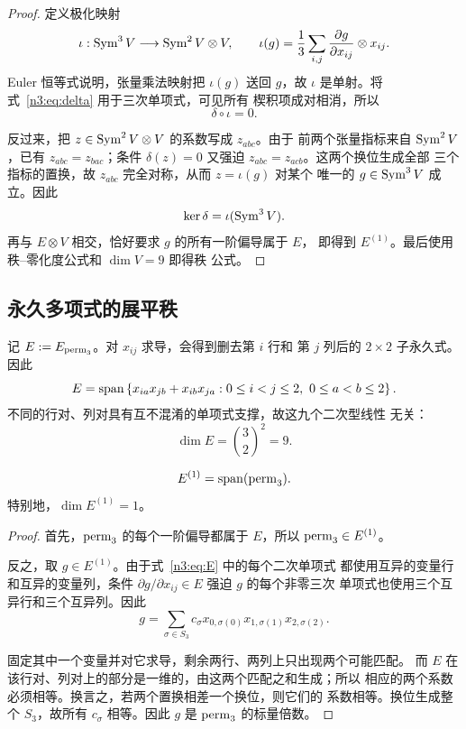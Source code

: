 \begin{proof}
定义极化映射
\[
  \iota:\operatorname{Sym}^3V\longrightarrow\operatorname{Sym}^2V\otimes V,
  \qquad
  \iota(g)=\frac13\sum_{i,j}
  \frac{\partial g}{\partial x_{ij}}\otimes x_{ij}.
\]
Euler 恒等式说明，张量乘法映射把 \(\iota(g)\) 送回 \(g\)，故
\(\iota\) 是单射。将式~\eqref{n3:eq:delta} 用于三次单项式，可见所有
楔积项成对相消，所以
\[
  \delta\circ\iota=0.
\]

反过来，把 \(z\in\operatorname{Sym}^2V\otimes V\) 的系数写成 \(z_{abc}\)。由于
前两个张量指标来自 \(\operatorname{Sym}^2V\)，已有 \(z_{abc}=z_{bac}\)；条件
\(\delta(z)=0\) 又强迫 \(z_{abc}=z_{acb}\)。这两个换位生成全部
三个指标的置换，故 \(z_{abc}\) 完全对称，从而 \(z=\iota(g)\) 对某个
唯一的 \(g\in\operatorname{Sym}^3V\) 成立。因此
\[
  \ker\delta=\iota(\operatorname{Sym}^3V).
\]
再与 \(E\otimes V\) 相交，恰好要求 \(g\) 的所有一阶偏导属于 \(E\)，
即得到 \(E^{(1)}\)。最后使用秩--零化度公式和 \(\dim V=9\) 即得秩
公式。
\end{proof}

\subsection{永久多项式的展平秩}

记 \(E:=E_{\operatorname{perm}_3}\)。对 \(x_{ij}\) 求导，会得到删去第 \(i\) 行和
第 \(j\) 列后的 \(2\times2\) 子永久式。因此
\begin{equation}\label{n3:eq:E}
  E=
  \operatorname{span}\left\{
  x_{ia}x_{jb}+x_{ib}x_{ja}:
  0\leq i<j\leq2,\ 0\leq a<b\leq2
  \right\}.
\end{equation}
不同的行对、列对具有互不混淆的单项式支撑，故这九个二次型线性
无关：
\begin{equation}\label{n3:eq:E-dim}
  \dim E=\binom32^2=9.
\end{equation}

\begin{proposition}\label{n3:prop:prolongation}
\[
  E^{(1)}=\operatorname{span}(\operatorname{perm}_3).
\]
特别地，\(\dim E^{(1)}=1\)。
\end{proposition}

\begin{proof}
首先，\(\operatorname{perm}_3\) 的每个一阶偏导都属于 \(E\)，所以
\(\operatorname{perm}_3\in E^{(1)}\)。

反之，取 \(g\in E^{(1)}\)。由于式~\eqref{n3:eq:E} 中的每个二次单项式
都使用互异的变量行和互异的变量列，条件
\(\partial g/\partial x_{ij}\in E\) 强迫 \(g\) 的每个非零三次
单项式也使用三个互异行和三个互异列。因此
\[
  g=\sum_{\sigma\in S_3}c_{\sigma}
  x_{0,\sigma(0)}x_{1,\sigma(1)}x_{2,\sigma(2)}.
\]

固定其中一个变量并对它求导，剩余两行、两列上只出现两个可能匹配。
而 \(E\) 在该行对、列对上的部分是一维的，由这两个匹配之和生成；所以
相应的两个系数必须相等。换言之，若两个置换相差一个换位，则它们的
系数相等。换位生成整个 \(S_3\)，故所有 \(c_{\sigma}\) 相等。因此
\(g\) 是 \(\operatorname{perm}_3\) 的标量倍数。
\end{proof}

